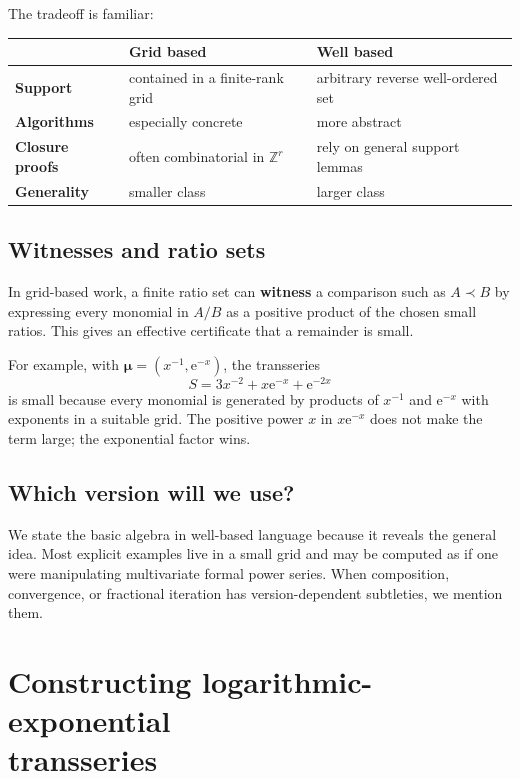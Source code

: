 \documentclass[11pt,openany]{book}
\theoremstyle{plain}
\theoremstyle{definition}
\theoremstyle{remark}
\newcommand{\Z}{\mathbb{Z}}
\newcommand{\e}{\mathrm{e}}
\newcommand{\defterm}[1]{\textbf{#1}}
\begin{document}
The tradeoff is familiar:
\begin{center}
\begin{tabularx}{0.92\textwidth}{@{}>{\bfseries}lXX@{}}
\toprule
 & Grid based & Well based\\
\midrule
Support & contained in a finite-rank grid & arbitrary reverse well-ordered set\\
Algorithms & especially concrete & more abstract\\
Closure proofs & often combinatorial in $\Z^r$ & rely on general support lemmas\\
Generality & smaller class & larger class\\
\bottomrule
\end{tabularx}
\end{center}

\section{Witnesses and ratio sets}
In grid-based work, a finite ratio set can \defterm{witness} a comparison such as $A\prec B$ by expressing every monomial in $A/B$ as a positive product of the chosen small ratios. This gives an effective certificate that a remainder is small.

For example, with $\boldsymbol\mu=(x^{-1},\e^{-x})$, the transseries
\[
  S=3x^{-2}+x\e^{-x}+\e^{-2x}
\]
is small because every monomial is generated by products of $x^{-1}$ and $\e^{-x}$ with exponents in a suitable grid. The positive power $x$ in $x\e^{-x}$ does not make the term large; the exponential factor wins.

\section{Which version will we use?}
We state the basic algebra in well-based language because it reveals the general idea. Most explicit examples live in a small grid and may be computed as if one were manipulating multivariate formal power series. When composition, convergence, or fractional iteration has version-dependent subtleties, we mention them.

\chapter[Constructing logarithmic-exponential transseries]{Constructing logarithmic-exponential\\transseries}
\label{chap:construction}
\end{document}
